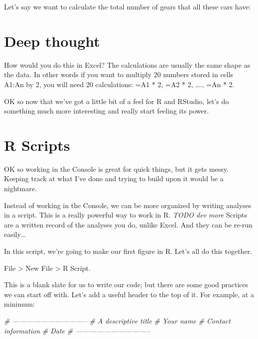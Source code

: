 \documentclass[]{book}
\newenvironment{Shaded}{\begin{snugshade}}{\end{snugshade}}
\newcommand{\CommentTok}[1]{\textcolor[rgb]{0.56,0.35,0.01}{\textit{#1}}}
\newcommand{\KeywordTok}[1]{\textcolor[rgb]{0.13,0.29,0.53}{\textbf{#1}}}
\newcommand{\NormalTok}[1]{#1}
\newcommand{\OperatorTok}[1]{\textcolor[rgb]{0.81,0.36,0.00}{\textbf{#1}}}
\begin{document}
Let's say we want to calculate the total number of gears that all these cars have:

\begin{Shaded}
\end{Shaded}

\hypertarget{deep-thought}{%
\section{Deep thought}\label{deep-thought}}

How would you do this in Excel?
The calculations are usually the same shape as the data. In other words if you want to multiply 20 numbers stored in cells A1:An by 2, you will need 20 calculations: =A1 * 2, =A2 * 2, \ldots{}., =An * 2.

OK so now that we've got a little bit of a feel for R and RStudio, let's do something much more interesting and really start feeling its power.

\hypertarget{r-scripts}{%
\section{R Scripts}\label{r-scripts}}

OK so working in the Console is great for quick things, but it gets messy. Keeping track at what I've done and trying to build upon it would be a nightmare.

Instead of working in the Console, we can be more organized by writing analyses in a script. This is a really powerful way to work in R. \emph{TODO dev more} Scripts are a written record of the analyses you do, unlike Excel. And they can be re-run easily\ldots{}

In this script, we're going to make our first figure in R. Let's all do this together.

File \textgreater{} New File \textgreater{} R Script.

This is a blank slate for us to write our code; but there are some good practices we can start off with. Let's add a useful header to the top of it. For example, at a minimum:

\begin{Shaded}
\begin{Highlighting}[]
\CommentTok{# --------------------------------}
\CommentTok{# A descriptive title}
\CommentTok{# Your name}
\CommentTok{# Contact information}
\CommentTok{# Date}
\CommentTok{# --------------------------------}
\end{Highlighting}
\end{Shaded}
\end{document}
